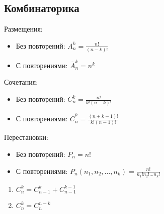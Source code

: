 \documentclass{article}
\begin{document}
\subsection*{Комбинаторика}
Размещения: 
\begin{itemize}
	\item Без повторений: $A_n^k = \frac{n!}{(n - k)!} $
	\item С повторениями: $\overline{A}_n^k = n^k $
\end{itemize}
Сочетания:
\begin{itemize}
	\item Без повторений: $C_n^k = \frac{n!}{k! (n - k)!}$
	\item С повторениями: $\overline{C}_n^k = \frac{(n + k - 1)!}{k! (n - 1)!} $
\end{itemize}
Перестановки:
\begin{itemize}
	\item Без повторений: $P_n = n!$
	\item С повторениями: $P_n(n_1, n_2, \dots, n_k) = \frac{n!}{n_1! n_2! \dots n_k!} $
\end{itemize}
\begin{enumerate}
	\item $C_n^k = C_{n - 1}^k + C_{n - 1}^{k - 1} $
	\item $C_n^k = C_{n}^{n - k} $
\end{enumerate}
\end{document}
